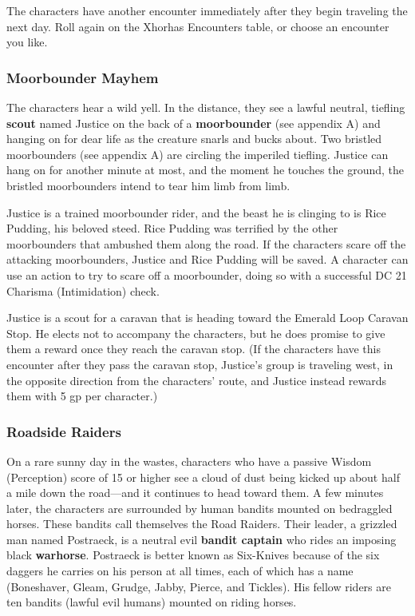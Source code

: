\documentclass[10pt,a4paper,twoside,bg=print,twocolumn,openany,nodeprecatedcode]{dndbook}
\begin{document}
The characters have another encounter immediately after they begin traveling the next day. Roll again on the Xhorhas Encounters table, or choose an encounter you like.

\subsubsection{Moorbounder Mayhem}
The characters hear a wild yell. In the distance, they see a lawful neutral, tiefling \textbf{scout} named Justice on the back of a \textbf{moorbounder} (see appendix A) and hanging on for dear life as the creature snarls and bucks about. Two bristled moorbounders (see appendix A) are circling the imperiled tiefling. Justice can hang on for another minute at most, and the moment he touches the ground, the bristled moorbounders intend to tear him limb from limb.

Justice is a trained moorbounder rider, and the beast he is clinging to is Rice Pudding, his beloved steed. Rice Pudding was terrified by the other moorbounders that ambushed them along the road. If the characters scare off the attacking moorbounders, Justice and Rice Pudding will be saved. A character can use an action to try to scare off a moorbounder, doing so with a successful DC 21 Charisma (Intimidation) check.

Justice is a scout for a caravan that is heading toward the Emerald Loop Caravan Stop. He elects not to accompany the characters, but he does promise to give them a reward once they reach the caravan stop. (If the characters have this encounter after they pass the caravan stop, Justice's group is traveling west, in the opposite direction from the characters' route, and Justice instead rewards them with 5 gp per character.)

\subsubsection{Roadside Raiders}
On a rare sunny day in the wastes, characters who have a passive Wisdom (Perception) score of 15 or higher see a cloud of dust being kicked up about half a mile down the road—and it continues to head toward them. A few minutes later, the characters are surrounded by human bandits mounted on bedraggled horses. These bandits call themselves the Road Raiders. Their leader, a grizzled man named Postraeck, is a neutral evil \textbf{bandit captain} who rides an imposing black \textbf{warhorse}. Postraeck is better known as Six-Knives because of the six daggers he carries on his person at all times, each of which has a name (Boneshaver, Gleam, Grudge, Jabby, Pierce, and Tickles). His fellow riders are ten bandits (lawful evil humans) mounted on riding horses.
\end{document}
